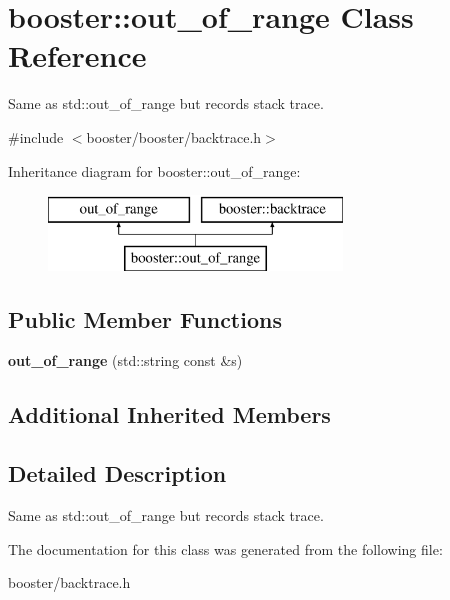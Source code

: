 \section{booster\+:\+:out\+\_\+of\+\_\+range Class Reference}
\label{classbooster_1_1out__of__range}


Same as std\+::out\+\_\+of\+\_\+range but records stack trace.  




{\ttfamily \#include $<$booster/booster/backtrace.\+h$>$}

Inheritance diagram for booster\+:\+:out\+\_\+of\+\_\+range\+:\begin{figure}[H]
\begin{center}
\leavevmode
\includegraphics[height=2.000000cm]{classbooster_1_1out__of__range}
\end{center}
\end{figure}
\subsection*{Public Member Functions}
\begin{DoxyCompactItemize}
\item 
{\bfseries out\+\_\+of\+\_\+range} (std\+::string const \&s)\label{classbooster_1_1out__of__range_a8682d7da97d49768d8c0b3bd5338c4cc}

\end{DoxyCompactItemize}
\subsection*{Additional Inherited Members}


\subsection{Detailed Description}
Same as std\+::out\+\_\+of\+\_\+range but records stack trace. 

The documentation for this class was generated from the following file\+:\begin{DoxyCompactItemize}
\item 
booster/backtrace.\+h\end{DoxyCompactItemize}
